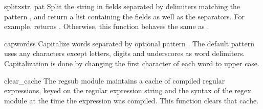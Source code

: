\begin{funcdesc}{splitx}{str, pat}
Split the string  in fields separated by delimiters matching
the pattern , and return a list containing the fields as well
as the separators.  For example,  returns
\code{['a', ':::', 'b']}.  Otherwise, this function behaves the same
as .
\end{funcdesc}

\begin{funcdesc}{capwords}{s}
Capitalize words separated by optional pattern .  The default
pattern uses any characters except letters, digits and underscores as
word delimiters.  Capitalization is done by changing the first
character of each word to upper case.
\end{funcdesc}

\begin{funcdesc}{clear_cache}{}
The regsub module maintains a cache of compiled regular expressions,
keyed on the regular expression string and the syntax of the regex
module at the time the expression was compiled.  This function clears
that cache.
\end{funcdesc}
